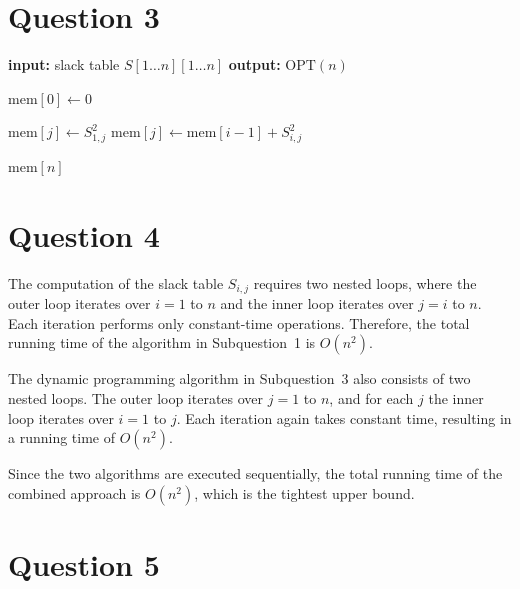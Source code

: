 \documentclass[a4paper,11pt]{article}
\begin{document}
	\section{Question 3}

	\begin{algorithm}[H]
		\caption{Compute optimal sum of squared slacks}
		\label{alg:pretty_print_dp}
		\begin{algorithmic}[1]
			\State \textbf{input:} slack table $S[1 \dots n][1 \dots n]$
			\State \textbf{output:} $\mathrm{OPT}(n)$

			\State $\text{mem}[0] \gets 0$

			\State $\text{mem}[j] \gets S_{1,j}^2$
			\State $\text{mem}[j] \gets \text{mem}[i-1] + S_{i,j}^2$
			\EndIf
			\EndFor
			\EndFor

			\State \Return $\text{mem}[n]$
		\end{algorithmic}
	\end{algorithm}

	\section{Question 4}
	The computation of the slack table $S_{i,j}$ requires two nested loops, where the outer loop iterates over
	$i = 1$ to $n$ and the inner loop iterates over $j = i$ to $n$. Each iteration performs only constant-time
	operations. Therefore, the total running time of the algorithm in Subquestion~1 is $O(n^2)$.

	The dynamic programming algorithm in Subquestion~3 also consists of two nested loops. The outer loop
	iterates over $j = 1$ to $n$, and for each $j$ the inner loop iterates over $i = 1$ to $j$. Each iteration again
	takes constant time, resulting in a running time of $O(n^2)$.

	Since the two algorithms are executed sequentially, the total running time of the combined approach is
	$O(n^2)$, which is the tightest upper bound.

	\section{Question 5}
\end{document}
